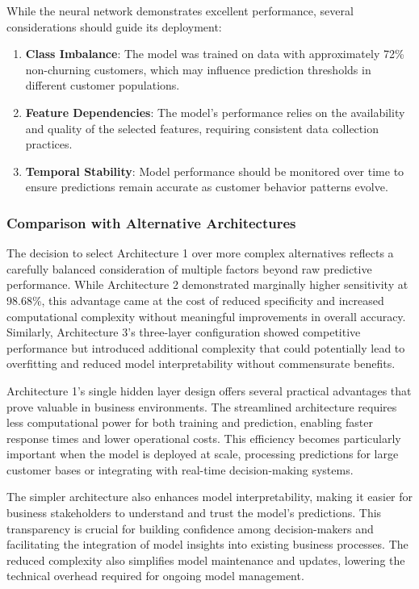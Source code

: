 \documentclass[
]{article}
\begin{document}
While the neural network demonstrates excellent performance, several
considerations should guide its deployment:

\begin{enumerate}
\def\labelenumi{\arabic{enumi}.}
\item
  \textbf{Class Imbalance}: The model was trained on data with
  approximately 72\% non-churning customers, which may influence
  prediction thresholds in different customer populations.
\item
  \textbf{Feature Dependencies}: The model's performance relies on the
  availability and quality of the selected features, requiring
  consistent data collection practices.
\item
  \textbf{Temporal Stability}: Model performance should be monitored
  over time to ensure predictions remain accurate as customer behavior
  patterns evolve.
\end{enumerate}

\hypertarget{comparison-with-alternative-architectures}{%
\subsubsection{Comparison with Alternative
Architectures}\label{comparison-with-alternative-architectures}}

The decision to select Architecture 1 over more complex alternatives
reflects a carefully balanced consideration of multiple factors beyond
raw predictive performance. While Architecture 2 demonstrated marginally
higher sensitivity at 98.68\%, this advantage came at the cost of
reduced specificity and increased computational complexity without
meaningful improvements in overall accuracy. Similarly, Architecture 3's
three-layer configuration showed competitive performance but introduced
additional complexity that could potentially lead to overfitting and
reduced model interpretability without commensurate benefits.

Architecture 1's single hidden layer design offers several practical
advantages that prove valuable in business environments. The streamlined
architecture requires less computational power for both training and
prediction, enabling faster response times and lower operational costs.
This efficiency becomes particularly important when the model is
deployed at scale, processing predictions for large customer bases or
integrating with real-time decision-making systems.

The simpler architecture also enhances model interpretability, making it
easier for business stakeholders to understand and trust the model's
predictions. This transparency is crucial for building confidence among
decision-makers and facilitating the integration of model insights into
existing business processes. The reduced complexity also simplifies
model maintenance and updates, lowering the technical overhead required
for ongoing model management.
\end{document}

